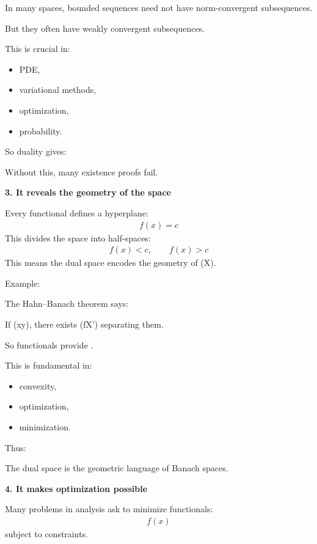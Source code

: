 \begin{description}
In many spaces, bounded sequences need not have norm-convergent subsequences.

But they often have weakly convergent subsequences.

This is crucial in:

	\begin{itemize}
    \item PDE,
    \item variational methods,
    \item optimization,
    \item probability.
	\end{itemize}

So duality gives:

\> 

Without this, many existence proofs fail.

\item \textbf{3. It reveals the geometry of the space}

Every functional defines a hyperplane:
\begin{align*}
f(x)=c
\end{align*}
This divides the space into half-spaces:
\begin{align*}
f(x)<c,\qquad f(x)>c
\end{align*}
This means the dual space encodes the geometry of (X).

    \item Example:

The Hahn–Banach theorem says:

\> If (x\neq y), there exists (f\in X') separating them.

So functionals provide .

This is fundamental in:
	\begin{itemize}
    \item convexity,
    \item optimization,
    \item minimization.
	\end{itemize}

Thus:

\> The dual space is the geometric language of Banach spaces.

\item \textbf{4. It makes optimization possible}

Many problems in analysis ask to minimize functionals:
\begin{align*}
f(x)
\end{align*}
subject to constraints.


\end{description}
